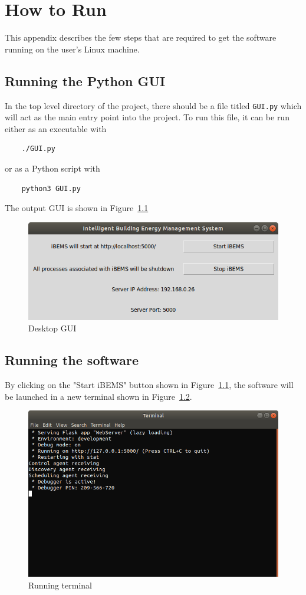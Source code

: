 \chapter{How to Run}
\label{ap: appendixB}

This appendix describes the few steps that are required to get the software running on the user's Linux machine.

\section{Running the Python GUI}
In the top level directory of the project, there should be a file titled \texttt{GUI.py} which will act as the main entry point into the project. To run this file, it can be run either as an executable with
\begin{verbatim}
    ./GUI.py
\end{verbatim}
or as a Python script with
\begin{verbatim}
    python3 GUI.py
\end{verbatim}
The output GUI is shown in Figure~\ref{fig:desktopGUI}
\begin{figure}[H]
    \centering
    \includegraphics[scale=0.5]{figs/GUI/desktopGUI.png}
    \caption{Desktop GUI}
    \label{fig:desktopGUI}
\end{figure}

\section{Running the software}
By clicking on the "Start iBEMS" button shown in Figure~\ref{fig:desktopGUI}, the software will be launched in a new terminal shown in Figure~\ref{fig:runningterminal}.
\begin{figure}[H]
    \centering
    \includegraphics[scale=0.4]{figs/runningterminal.png}
    \caption{Running terminal}
    \label{fig:runningterminal}
\end{figure}
